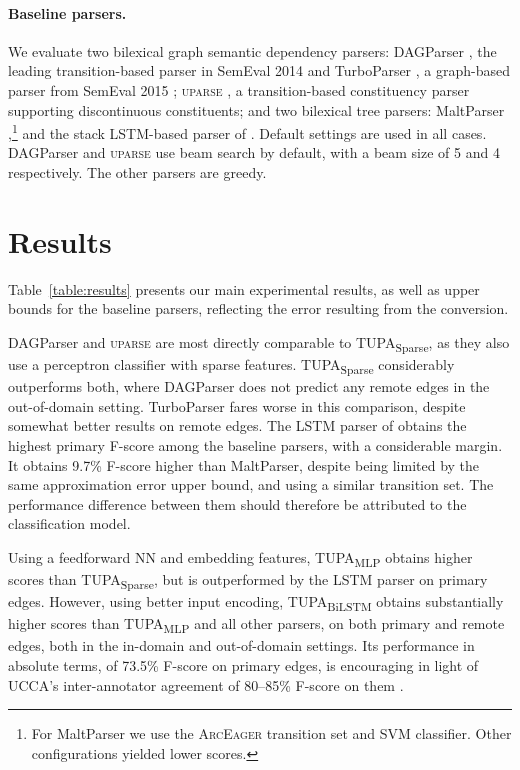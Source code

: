 \documentclass[11pt,a4paper]{article}
\newcommand{\parser}[1]{TUPA\textsubscript{#1}}
\newcommand{\tabref}[1]{Table~\ref{#1}}
\begin{document}
\paragraph{Baseline parsers.}
We evaluate two bilexical graph semantic dependency parsers:
DAGParser \cite{ribeyre-villemontedelaclergerie-seddah:2014:SemEval}, the leading 
transition-based parser in SemEval 2014 \cite{oepen2014semeval} and
TurboParser \cite{almeida-martins:2015:SemEval},
a graph-based parser from SemEval 2015 
\cite{oepen2015semeval};
\textsc{uparse} \cite{maier-lichte:2016:DiscoNLP},
a transition-based constituency parser supporting discontinuous constituents;
and two bilexical tree parsers:
MaltParser \cite{nivre2007maltparser},\footnote{For
MaltParser we use the \textsc{ArcEager} transition set and SVM classifier.
Other configurations yielded lower scores.}
and the stack LSTM-based parser of
\citet[henceforce ``LSTM Parser'']{dyer2015transition}.
Default settings are used in all cases.
DAGParser and \textsc{uparse} use beam search by default, with a beam size of 5 and 4
respectively. The other parsers are greedy.



\section{Results}\label{sec:results}

\tabref{table:results} presents our main experimental results, as well as
upper bounds for the baseline parsers,
reflecting the error resulting from the conversion.

DAGParser and \textsc{uparse} are most directly comparable to
\parser{Sparse}, as they also use a perceptron classifier with sparse features.
\parser{Sparse} considerably outperforms both, where
DAGParser does not predict any remote edges in the out-of-domain setting.
TurboParser fares worse in this comparison, despite somewhat better results on
remote edges.
The LSTM parser of \citet{dyer2015transition} obtains the highest primary F-score
among the baseline parsers, with a considerable margin.
It obtains 9.7\% F-score higher than MaltParser,
despite being limited by the same approximation error upper bound,
and using a similar transition set.
The performance difference between them should therefore be attributed to the classification model.

Using a feedforward NN and embedding features,
\parser{MLP} obtains higher scores than \parser{Sparse},
but is outperformed by the LSTM parser on primary edges.
However, using better input encoding,
\parser{BiLSTM} obtains substantially higher scores than \parser{MLP}
and all other parsers, on both primary and remote edges,
both in the in-domain and out-of-domain settings.
Its performance in absolute terms, of 73.5\% F-score on primary edges,
is encouraging in light of
UCCA's inter-annotator agreement of 80--85\%
F-score on them \cite{abend2013universal}.
\end{document}
